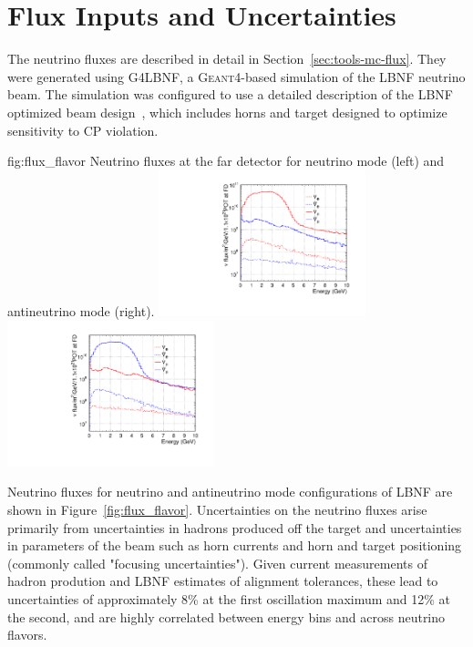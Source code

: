 \section{Flux Inputs and Uncertainties}\label{sec:nu-osc-05}
\label{sec:physics-lbnosc-flux}

The neutrino fluxes are described in detail in Section~\ref{sec:tools-mc-flux}.  They were generated using G4LBNF, a \textsc{Geant}4\xspace-based simulation of the LBNF neutrino beam.  The simulation was configured to use a detailed description of the LBNF optimized beam design~\cite{optimizedbeamcdr}, which includes horns and target designed to optimize sensitivity to CP violation.   

\begin{dunefigure}{fig:flux_flavor}
{Neutrino fluxes at the far detector for neutrino mode (left) and
antineutrino mode (right). }
    \includegraphics[width=0.45\textwidth]{graphics/dune_neutrino_fd_log.pdf}
     \includegraphics[width=0.45\textwidth]{graphics/dune_antineutrino_fd_log.pdf}
\end{dunefigure}

Neutrino fluxes for neutrino and antineutrino mode configurations of LBNF are shown in Figure~\ref{fig:flux_flavor}.   Uncertainties on the neutrino fluxes arise primarily from uncertainties in hadrons produced off the target and uncertainties in parameters of the beam such as horn currents and horn and target positioning (commonly called "focusing uncertainties"). Given current measurements of hadron prodution and LBNF estimates of alignment tolerances, these lead to uncertainties of approximately 8\% at the first oscillation maximum and 12\% at the second, and are highly correlated between energy bins and across neutrino flavors.       

